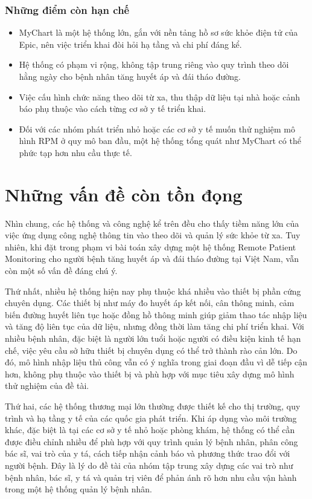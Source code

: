 \subsubsection{Những điểm còn hạn chế}
\begin{itemize}
    \item MyChart là một hệ thống lớn, gắn với nền tảng hồ sơ sức khỏe điện tử của Epic, nên việc triển khai đòi hỏi hạ tầng và chi phí đáng kể.
    \item Hệ thống có phạm vi rộng, không tập trung riêng vào quy trình theo dõi hằng ngày cho bệnh nhân tăng huyết áp và đái tháo đường.
    \item Việc cấu hình chức năng theo dõi từ xa, thu thập dữ liệu tại nhà hoặc cảnh báo phụ thuộc vào cách từng cơ sở y tế triển khai.
    \item Đối với các nhóm phát triển nhỏ hoặc các cơ sở y tế muốn thử nghiệm mô hình RPM ở quy mô ban đầu, một hệ thống tổng quát như MyChart có thể phức tạp hơn nhu cầu thực tế.
\end{itemize}

\section{Những vấn đề còn tồn đọng}

\par Nhìn chung, các hệ thống và công nghệ kể trên đều cho thấy tiềm năng lớn của việc ứng dụng công nghệ thông tin vào theo dõi và quản lý sức khỏe từ xa. Tuy nhiên, khi đặt trong phạm vi bài toán xây dựng một hệ thống Remote Patient Monitoring cho người bệnh tăng huyết áp và đái tháo đường tại Việt Nam, vẫn còn một số vấn đề đáng chú ý.

\par Thứ nhất, nhiều hệ thống hiện nay phụ thuộc khá nhiều vào thiết bị phần cứng chuyên dụng. Các thiết bị như máy đo huyết áp kết nối, cân thông minh, cảm biến đường huyết liên tục hoặc đồng hồ thông minh giúp giảm thao tác nhập liệu và tăng độ liên tục của dữ liệu, nhưng đồng thời làm tăng chi phí triển khai. Với nhiều bệnh nhân, đặc biệt là người lớn tuổi hoặc người có điều kiện kinh tế hạn chế, việc yêu cầu sở hữu thiết bị chuyên dụng có thể trở thành rào cản lớn. Do đó, mô hình nhập liệu thủ công vẫn có ý nghĩa trong giai đoạn đầu vì dễ tiếp cận hơn, không phụ thuộc vào thiết bị và phù hợp với mục tiêu xây dựng mô hình thử nghiệm của đề tài.

\par Thứ hai, các hệ thống thương mại lớn thường được thiết kế cho thị trường, quy trình và hạ tầng y tế của các quốc gia phát triển. Khi áp dụng vào môi trường khác, đặc biệt là tại các cơ sở y tế nhỏ hoặc phòng khám, hệ thống có thể cần được điều chỉnh nhiều để phù hợp với quy trình quản lý bệnh nhân, phân công bác sĩ, vai trò của y tá, cách tiếp nhận cảnh báo và phương thức trao đổi với người bệnh. Đây là lý do đề tài của nhóm tập trung xây dựng các vai trò như bệnh nhân, bác sĩ, y tá và quản trị viên để phản ánh rõ hơn nhu cầu vận hành trong một hệ thống quản lý bệnh nhân.

